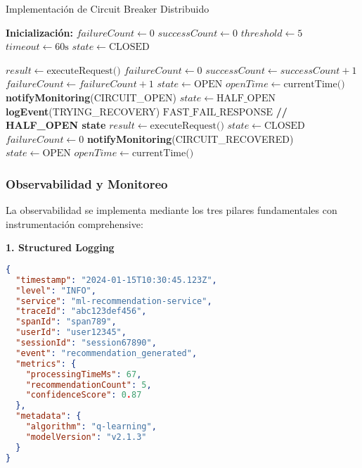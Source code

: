 \begin{algorithm}[H]
\caption{Implementación de Circuit Breaker Distribuido}
\label{alg:circuit_breaker}
\begin{algorithmic}[1]
\STATE \textbf{Inicialización:}
\STATE $failureCount \leftarrow 0$
\STATE $successCount \leftarrow 0$
\STATE $threshold \leftarrow 5$
\STATE $timeout \leftarrow 60\text{s}$
\STATE $state \leftarrow \text{CLOSED}$

        \STATE $result \leftarrow \text{executeRequest()}$
            \STATE $failureCount \leftarrow 0$
            \STATE $successCount \leftarrow successCount + 1$
        \ELSE
            \STATE $failureCount \leftarrow failureCount + 1$
                \STATE $state \leftarrow \text{OPEN}$
                \STATE $openTime \leftarrow \text{currentTime()}$
                \STATE \textbf{notifyMonitoring}(CIRCUIT\_OPEN)
            \ENDIF
        \ENDIF
            \STATE $state \leftarrow \text{HALF\_OPEN}$
            \STATE \textbf{logEvent}(TRYING\_RECOVERY)
        \ELSE
            \RETURN $\text{FAST\_FAIL\_RESPONSE}$
        \ENDIF
    \ELSE \textbf{// HALF\_OPEN state}
        \STATE $result \leftarrow \text{executeRequest()}$
            \STATE $state \leftarrow \text{CLOSED}$
            \STATE $failureCount \leftarrow 0$
            \STATE \textbf{notifyMonitoring}(CIRCUIT\_RECOVERED)
        \ELSE
            \STATE $state \leftarrow \text{OPEN}$
            \STATE $openTime \leftarrow \text{currentTime()}$
        \ENDIF
    \ENDIF
\ENDWHILE
\end{algorithmic}
\end{algorithm}

\subsubsection{Observabilidad y Monitoreo}

La observabilidad se implementa mediante los tres pilares fundamentales con instrumentación comprehensive:

\vspace{0.2cm}

\textbf{1. Structured Logging}
\begin{lstlisting}[language=json, caption=Formato de Log Estructurado, label=lst:structured_logging]
{
  "timestamp": "2024-01-15T10:30:45.123Z",
  "level": "INFO",
  "service": "ml-recommendation-service",
  "traceId": "abc123def456",
  "spanId": "span789",
  "userId": "user12345",
  "sessionId": "session67890",
  "event": "recommendation_generated",
  "metrics": {
    "processingTimeMs": 67,
    "recommendationCount": 5,
    "confidenceScore": 0.87
  },
  "metadata": {
    "algorithm": "q-learning",
    "modelVersion": "v2.1.3"
  }
}
\end{lstlisting}

